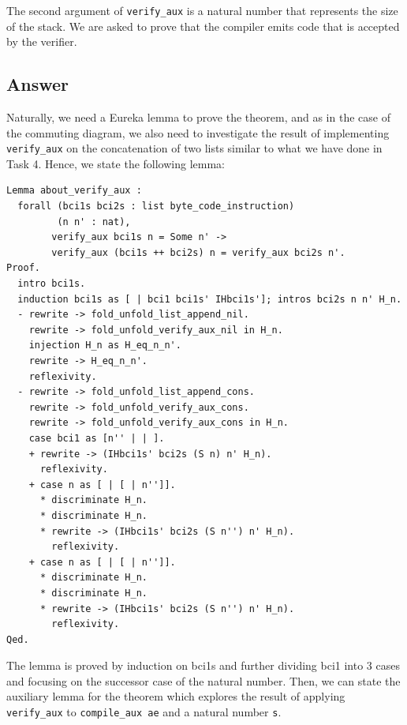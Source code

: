 \documentclass{article}
\begin{document}
The second argument of \texttt{verify\_aux} is a natural number that represents the size of the stack. We are asked to prove that the compiler emits code that is accepted by the verifier.

\subsection{Answer}
Naturally, we need a Eureka lemma to prove the theorem, and as in the case of the commuting diagram, we also need to investigate the result of implementing \texttt{verify\_aux} on the concatenation of two lists similar to what we have done in Task 4. Hence, we state the following lemma:
\begin{lstlisting}
Lemma about_verify_aux :
  forall (bci1s bci2s : list byte_code_instruction)
         (n n' : nat),
        verify_aux bci1s n = Some n' ->
        verify_aux (bci1s ++ bci2s) n = verify_aux bci2s n'.
Proof.
  intro bci1s.
  induction bci1s as [ | bci1 bci1s' IHbci1s']; intros bci2s n n' H_n.
  - rewrite -> fold_unfold_list_append_nil.
    rewrite -> fold_unfold_verify_aux_nil in H_n.
    injection H_n as H_eq_n_n'.
    rewrite -> H_eq_n_n'.
    reflexivity.
  - rewrite -> fold_unfold_list_append_cons.
    rewrite -> fold_unfold_verify_aux_cons.
    rewrite -> fold_unfold_verify_aux_cons in H_n.
    case bci1 as [n'' | | ].
    + rewrite -> (IHbci1s' bci2s (S n) n' H_n).
      reflexivity.
    + case n as [ | [ | n'']].
      * discriminate H_n.
      * discriminate H_n.
      * rewrite -> (IHbci1s' bci2s (S n'') n' H_n).
        reflexivity.
    + case n as [ | [ | n'']].
      * discriminate H_n.
      * discriminate H_n.
      * rewrite -> (IHbci1s' bci2s (S n'') n' H_n).
        reflexivity.
Qed.
\end{lstlisting}

The lemma is proved by induction on bci1s and further dividing bci1 into 3 cases and focusing on the successor case of the natural number. Then, we can state the auxiliary lemma for the theorem which explores the result of applying \texttt{verify\_aux} to \texttt{compile\_aux ae} and a natural number \texttt{s}.
\end{document}
